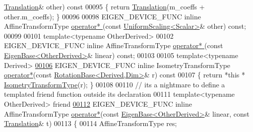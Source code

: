 \begin{DoxyCode}
      \hyperlink{group___geometry___module_class_eigen_1_1_translation}{Translation}& other)\textcolor{keyword}{ const}
00095 \textcolor{keyword}{  }\{ \textcolor{keywordflow}{return} \hyperlink{group___geometry___module_a6220051bf3a13f8180ddefbae198493e}{Translation}(m\_coeffs + other.m\_coeffs); \}
00096 
00098   EIGEN\_DEVICE\_FUNC \textcolor{keyword}{inline} AffineTransformType \hyperlink{group___geometry___module_abfbbd7dee9da6e449439a138c6ce9068}{operator* }(\textcolor{keyword}{const} 
      \hyperlink{class_eigen_1_1_uniform_scaling}{UniformScaling<Scalar>}& other) \textcolor{keyword}{const};
00099 
00101   \textcolor{keyword}{template}<\textcolor{keyword}{typename} OtherDerived>
00102   EIGEN\_DEVICE\_FUNC \textcolor{keyword}{inline} AffineTransformType \hyperlink{group___geometry___module_abfbbd7dee9da6e449439a138c6ce9068}{operator* }(\textcolor{keyword}{const} 
      \hyperlink{group___core___module_struct_eigen_1_1_eigen_base}{EigenBase<OtherDerived>}& linear) \textcolor{keyword}{const};
00103 
00105   \textcolor{keyword}{template}<\textcolor{keyword}{typename} Derived>
\hyperlink{group___geometry___module_ad39a0cf47e1ffc0fa6d8e223dd0e0e85}{00106}   EIGEN\_DEVICE\_FUNC \textcolor{keyword}{inline} IsometryTransformType \hyperlink{group___geometry___module_ad39a0cf47e1ffc0fa6d8e223dd0e0e85}{operator*}(\textcolor{keyword}{const} 
      \hyperlink{class_eigen_1_1_rotation_base}{RotationBase<Derived,Dim>}& r)\textcolor{keyword}{ const}
00107 \textcolor{keyword}{  }\{ \textcolor{keywordflow}{return} *\textcolor{keyword}{this} * \hyperlink{group___geometry___module_ad3ac890d85420ba78e16dab1983d1a80}{IsometryTransformType}(r); \}
00108 
00110   \textcolor{comment}{// its a nightmare to define a templated friend function outside its declaration}
00111   \textcolor{keyword}{template}<\textcolor{keyword}{typename} OtherDerived> \textcolor{keyword}{friend}
\hyperlink{group___geometry___module_a4ab2405ba944f5cafc9487f147a104ef}{00112}   EIGEN\_DEVICE\_FUNC \textcolor{keyword}{inline} AffineTransformType \hyperlink{group___geometry___module_a4ab2405ba944f5cafc9487f147a104ef}{operator*}(\textcolor{keyword}{const} 
      \hyperlink{group___core___module_struct_eigen_1_1_eigen_base}{EigenBase<OtherDerived>}& linear, \textcolor{keyword}{const} \hyperlink{group___geometry___module_class_eigen_1_1_translation}{Translation}& t)
00113   \{
00114     AffineTransformType res;

\end{DoxyCode}
